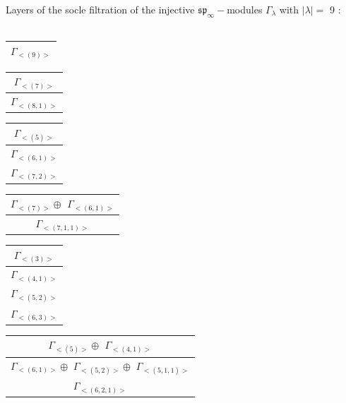 \bigskip
Layers of the socle filtration of the injective $\mathfrak{sp}_\infty-$modules $\Gamma_{\lambda}$ with $|\lambda| = $ 9 : \\\\
\begin{minipage}{.2\textwidth}
\centering
\begin{tabular}{|c|}\hline
$\Gamma_{<(
9
)>}$
\\
\hline\end{tabular}\end{minipage}
\begin{minipage}{.2\textwidth}
\centering
\begin{tabular}{|c|}\hline
$\Gamma_{<(
7
)>}$
\\ \hline
$\Gamma_{<(
8 , 
1
)>}$
\\
\hline\end{tabular}\end{minipage}
\begin{minipage}{.2\textwidth}
\centering
\begin{tabular}{|c|}\hline
$\Gamma_{<(
5
)>}$
\\ \hline
$\Gamma_{<(
6 , 
1
)>}$
\\ \hline
$\Gamma_{<(
7 , 
2
)>}$
\\
\hline\end{tabular}\end{minipage}
\begin{minipage}{.2\textwidth}
\centering
\begin{tabular}{|c|}\hline
$\Gamma_{<(
7
)>} \oplus$
$\Gamma_{<(
6 , 
1
)>}$
\\ \hline
$\Gamma_{<(
7 , 
1 , 
1
)>}$
\\
\hline\end{tabular}\end{minipage}
\begin{minipage}{.2\textwidth}
\centering
\begin{tabular}{|c|}\hline
$\Gamma_{<(
3
)>}$
\\ \hline
$\Gamma_{<(
4 , 
1
)>}$
\\ \hline
$\Gamma_{<(
5 , 
2
)>}$
\\ \hline
$\Gamma_{<(
6 , 
3
)>}$
\\
\hline\end{tabular}\end{minipage}
\bigskip
\begin{minipage}{.4\textwidth}
\centering
\begin{tabular}{|c|}\hline
$\Gamma_{<(
5
)>} \oplus$
$\Gamma_{<(
4 , 
1
)>}$
\\ \hline
$\Gamma_{<(
6 , 
1
)>} \oplus$
$\Gamma_{<(
5 , 
2
)>} \oplus$
$\Gamma_{<(
5 , 
1 , 
1
)>}$
\\ \hline
$\Gamma_{<(
6 , 
2 , 
1
)>}$
\\
\hline\end{tabular}\end{minipage}
